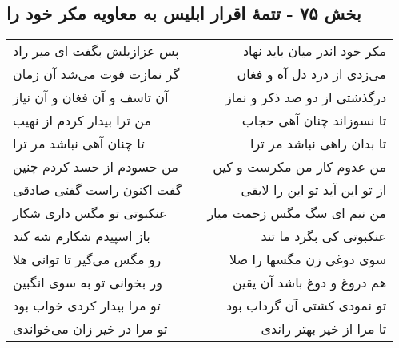 \begin{center}
\section*{بخش ۷۵ - تتمهٔ اقرار ابلیس به معاویه مکر خود را}
\label{sec:sh075}
\begin{longtable}{l p{0.5cm} r}
پس عزازیلش بگفت ای میر راد
&&
مکر خود اندر میان باید نهاد
\\
گر نمازت فوت می‌شد آن زمان
&&
می‌زدی از درد دل آه و فغان
\\
آن تاسف و آن فغان و آن نیاز
&&
درگذشتی از دو صد ذکر و نماز
\\
من ترا بیدار کردم از نهیب
&&
تا نسوزاند چنان آهی حجاب
\\
تا چنان آهی نباشد مر ترا
&&
تا بدان راهی نباشد مر ترا
\\
من حسودم از حسد کردم چنین
&&
من عدوم کار من مکرست و کین
\\
گفت اکنون راست گفتی صادقی
&&
از تو این آید تو این را لایقی
\\
عنکبوتی تو مگس داری شکار
&&
من نیم ای سگ مگس زحمت میار
\\
باز اسپیدم شکارم شه کند
&&
عنکبوتی کی بگرد ما تند
\\
رو مگس می‌گیر تا توانی هلا
&&
سوی دوغی زن مگسها را صلا
\\
ور بخوانی تو به سوی انگبین
&&
هم دروغ و دوغ باشد آن یقین
\\
تو مرا بیدار کردی خواب بود
&&
تو نمودی کشتی آن گرداب بود
\\
تو مرا در خیر زان می‌خواندی
&&
تا مرا از خیر بهتر راندی
\\
\end{longtable}
\end{center}

